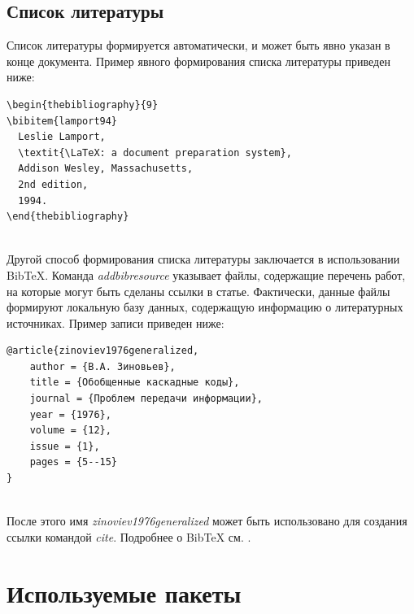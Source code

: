 \subsection{Список литературы}
Список литературы формируется автоматически, и может быть явно указан в конце документа.
Пример явного формирования списка литературы приведен ниже:\\[1em]

\begin{minipage}{\linewidth} %
\begin{verbatim}
\begin{thebibliography}{9}
\bibitem{lamport94}
  Leslie Lamport,
  \textit{\LaTeX: a document preparation system},
  Addison Wesley, Massachusetts,
  2nd edition,
  1994.
\end{thebibliography}
\end{verbatim}
\end{minipage}\\[1em]

Другой способ формирования списка литературы заключается в использовании BibTeX.
Команда {\em addbibresource} указывает файлы, содержащие перечень работ, на которые могут быть сделаны ссылки в статье.
Фактически, данные файлы формируют локальную базу данных, содержащую информацию о литературных источниках.
Пример записи приведен ниже:\\[1em]

\begin{minipage}{\linewidth} %
\begin{verbatim}
@article{zinoviev1976generalized,
    author = {В.А. Зиновьев},
    title = {Обобщенные каскадные коды},
    journal = {Проблем передачи информации},
    year = {1976},
    volume = {12},
    issue = {1},
    pages = {5--15}
}
\end{verbatim}
\end{minipage}\\[1em]

После этого имя {\em zinoviev1976generalized} может быть использовано для создания ссылки командой {\em cite}.
Подробнее о BibTeX см. \cite{latexBib}.

\clearpage
\section{Используемые пакеты}
